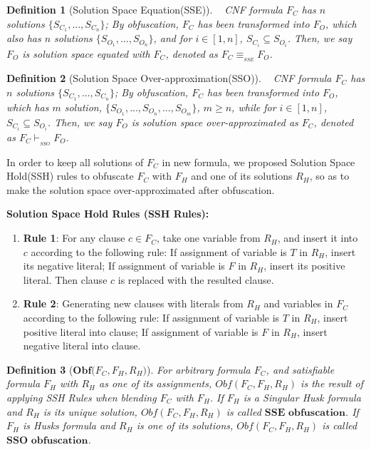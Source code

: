 \documentclass[conference]{IEEEtran}
\newtheorem{definition}{\textbf{Definition}}
\begin{document}
\begin{definition}[Solution Space Equation(SSE)]\label{SSEdefinition}~
CNF formula $F_C$ has $n$ solutions $\{S_{C_1},...,S_{C_n}\}$;
By obfuscation,
$F_C$ has been transformed into $F_O$,
which also has $n$ solutions $\{S_{O_1},...,S_{O_n}\}$,
and for $i \in [1,n]$, $S_{C_i} \subseteq S_{O_i}$.
Then, we say $F_O$ is solution space equated with $F_C$, 
denoted as  $F_C \equiv_{_{SSE}} F_O$.
\end{definition}

\begin{definition}[Solution Space Over-approximation(SSO)]\label{SSOdefinition}~
CNF formula $F_C$ has $n$ solutions $\{S_{C_1},...,S_{C_n}\}$;
By obfuscation,
$F_C$ has been transformed into $F_O$,
which has $m$ solution, $\{S_{O_1},...,S_{O_n},...,S_{O_m}\}$,
$m \geqslant n$,
while for $i \in [1,n]$, $S_{C_i} \subseteq S_{O_i}$.
Then, we say $F_O$ is solution space over-approximated as $F_C$, 
 denoted as $F_C \vdash_{_{SSO}} F_O$.
\end{definition}

In order to keep all solutions of $F_C$ in new formula,
we proposed Solution Space Hold(SSH) rules to obfuscate $F_C$ with $F_H$ and one of its solutions $R_H$,
so as to make the solution space over-approximated after obfuscation.

\textbf{Solution Space Hold Rules (SSH Rules): }
\begin{enumerate}
\item \textbf{Rule 1}:
For any clause $c\in F_{C}$, 
take one variable from $R_H$, 
and insert it into $c$ according to the following rule:
If assignment of variable is $T$ in $R_H$, insert its negative literal;
If assignment of variable is $F$ in $R_H$, insert its positive literal.
Then clause $c$ is replaced with the resulted clause.
\item \textbf{Rule 2}:
Generating new clauses with literals from $R_H$ and variables in $F_C$ according to the following rule:
If assignment of variable is $T$ in $R_H$, insert positive literal into clause;
If assignment of variable is $F$ in $R_H$, insert negative literal into clause.
\end{enumerate}

\begin{definition}[${\textbf{Obf(}}F_C,F_H,R_H\textbf{)}$]\label{OBFUSCATORSSH}
For arbitrary formula $F_C$, and satisfiable formula $F_H$ with $R_H$ as one of its assignments, 
$Obf(F_C,F_H,R_H)$ is the result of applying SSH Rules when blending $F_C$ with $F_H$.
If $F_H$ is a Singular Husk formula and $R_H$ is its unique solution, $Obf(F_C,F_H,R_H)$ is called ${\textbf{SSE obfuscation}}$.
If $F_H$ is Husks formula and $R_H$ is one of its solutions, $Obf(F_C,F_H,R_H)$ is called ${\textbf{SSO obfuscation}}$.
\end{definition}
\end{document}
